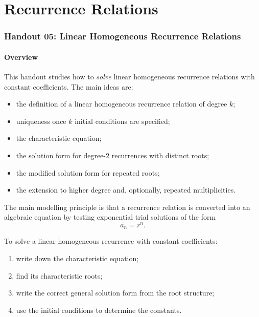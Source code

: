 \part{Recurrence Relations}
\section{Handout 05: Linear Homogeneous Recurrence Relations}

\subsection{Overview}

This handout studies how to \emph{solve} linear homogeneous recurrence relations with constant coefficients. The main ideas are:
\begin{itemize}[leftmargin=*]
    \item the definition of a linear homogeneous recurrence relation of degree $k$;
    \item uniqueness once $k$ initial conditions are specified;
    \item the characteristic equation;
    \item the solution form for degree-$2$ recurrences with distinct roots;
    \item the modified solution form for repeated roots;
    \item the extension to higher degree and, optionally, repeated multiplicities.
\end{itemize}

The main modelling principle is that a recurrence relation is converted into an algebraic equation by testing exponential trial solutions of the form
\[
a_n=r^n.
\]

\begin{examtip}[title={Main workflow for this handout}]
To solve a linear homogeneous recurrence with constant coefficients:
\begin{enumerate}[leftmargin=*]
    \item write down the characteristic equation;
    \item find its characteristic roots;
    \item write the correct general solution form from the root structure;
    \item use the initial conditions to determine the constants.
\end{enumerate}
\end{examtip}

